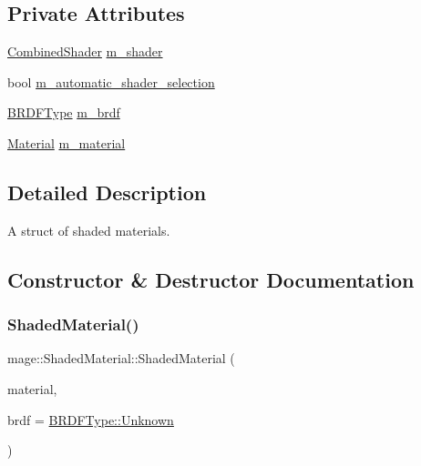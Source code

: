 \subsection*{Private Attributes}
\begin{DoxyCompactItemize}
\item 
\hyperlink{structmage_1_1_combined_shader}{Combined\+Shader} \hyperlink{structmage_1_1_shaded_material_a712d07ac1995ff592bbb8ab20a294270}{m\+\_\+shader}
\item 
bool \hyperlink{structmage_1_1_shaded_material_a744f6e4c0318f29f343039d6be072b66}{m\+\_\+automatic\+\_\+shader\+\_\+selection}
\item 
\hyperlink{namespacemage_ae7a7a03a7b34d7e2689689bb8295cd38}{B\+R\+D\+F\+Type} \hyperlink{structmage_1_1_shaded_material_a59a4b0ecb6ab1d60a285e0f1f69b5e36}{m\+\_\+brdf}
\item 
\hyperlink{structmage_1_1_material}{Material} \hyperlink{structmage_1_1_shaded_material_a319e1ca2103c50f84ce0605b08bd34b4}{m\+\_\+material}
\end{DoxyCompactItemize}


\subsection{Detailed Description}
A struct of shaded materials. 

\subsection{Constructor \& Destructor Documentation}
\hypertarget{structmage_1_1_shaded_material_a3b00f6ba8fc8a47e188b6adf28cc3460}{}\label{structmage_1_1_shaded_material_a3b00f6ba8fc8a47e188b6adf28cc3460} 
\subsubsection{\texorpdfstring{Shaded\+Material()}{ShadedMaterial()}\hspace{0.1cm}{\footnotesize\ttfamily [1/4]}}
{\footnotesize\ttfamily mage\+::\+Shaded\+Material\+::\+Shaded\+Material (\begin{DoxyParamCaption}\item[{const \hyperlink{structmage_1_1_material}{Material} \&}]{material,  }\item[{\hyperlink{namespacemage_ae7a7a03a7b34d7e2689689bb8295cd38}{B\+R\+D\+F\+Type}}]{brdf = {\ttfamily \hyperlink{namespacemage_ae7a7a03a7b34d7e2689689bb8295cd38a88183b946cc5f0e8c96b2e66e1c74a7e}{B\+R\+D\+F\+Type\+::\+Unknown}} }\end{DoxyParamCaption})\hspace{0.3cm}{\ttfamily [explicit]}}

